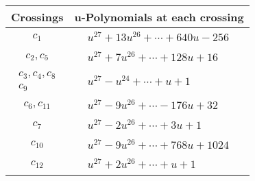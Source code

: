 \documentclass[1p]{elsarticle_modified}
\theoremstyle{definition}
\begin{document}
\begin{tabular}{m{50pt}|m{274pt}}
Crossings & \hspace{64pt}u-Polynomials at each crossing \\
\hline $$\begin{aligned}c_{1}\end{aligned}$$&$\begin{aligned}
&u^{27}+13 u^{26}+\cdots+640 u-256
\end{aligned}$\\
\hline $$\begin{aligned}c_{2},c_{5}\end{aligned}$$&$\begin{aligned}
&u^{27}+7 u^{26}+\cdots+128 u+16
\end{aligned}$\\
\hline $$\begin{aligned}c_{3},c_{4},c_{8}\\c_{9}\end{aligned}$$&$\begin{aligned}
&u^{27}- u^{24}+\cdots+u+1
\end{aligned}$\\
\hline $$\begin{aligned}c_{6},c_{11}\end{aligned}$$&$\begin{aligned}
&u^{27}-9 u^{26}+\cdots-176 u+32
\end{aligned}$\\
\hline $$\begin{aligned}c_{7}\end{aligned}$$&$\begin{aligned}
&u^{27}-2 u^{26}+\cdots+3 u+1
\end{aligned}$\\
\hline $$\begin{aligned}c_{10}\end{aligned}$$&$\begin{aligned}
&u^{27}-9 u^{26}+\cdots+768 u+1024
\end{aligned}$\\
\hline $$\begin{aligned}c_{12}\end{aligned}$$&$\begin{aligned}
&u^{27}+2 u^{26}+\cdots+u+1
\end{aligned}$\\
\hline
\end{tabular}\\~\\
\end{document}
